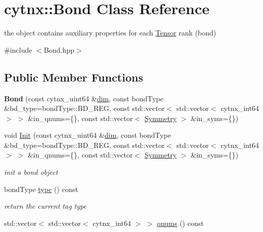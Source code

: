 \hypertarget{classcytnx_1_1Bond}{}\section{cytnx\+:\+:Bond Class Reference}
\label{classcytnx_1_1Bond}


the object contains auxiliary properties for each \hyperlink{classcytnx_1_1Tensor}{Tensor} rank (bond)  




{\ttfamily \#include $<$Bond.\+hpp$>$}

\subsection*{Public Member Functions}
\begin{DoxyCompactItemize}
\item 
\mbox{\label{classcytnx_1_1Bond_a80ee6b9a0dd288e74d885f6f288b5a0c}} 
{\bfseries Bond} (const cytnx\+\_\+uint64 \&\hyperlink{classcytnx_1_1Bond_aa072647e03a4c797479445bd41b9eacf}{dim}, const bond\+Type \&bd\+\_\+type=bond\+Type\+::\+B\+D\+\_\+\+R\+EG, const std\+::vector$<$ std\+::vector$<$ cytnx\+\_\+int64 $>$ $>$ \&in\+\_\+qnums=\{\}, const std\+::vector$<$ \hyperlink{classcytnx_1_1Symmetry}{Symmetry} $>$ \&in\+\_\+syms=\{\})
\item 
void \hyperlink{classcytnx_1_1Bond_a707a803fa98fb6a87b5f3c3b3000509f}{Init} (const cytnx\+\_\+uint64 \&\hyperlink{classcytnx_1_1Bond_aa072647e03a4c797479445bd41b9eacf}{dim}, const bond\+Type \&bd\+\_\+type=bond\+Type\+::\+B\+D\+\_\+\+R\+EG, const std\+::vector$<$ std\+::vector$<$ cytnx\+\_\+int64 $>$ $>$ \&in\+\_\+qnums=\{\}, const std\+::vector$<$ \hyperlink{classcytnx_1_1Symmetry}{Symmetry} $>$ \&in\+\_\+syms=\{\})
\begin{DoxyCompactList}\small\item\em init a bond object \end{DoxyCompactList}\item 
bond\+Type \hyperlink{classcytnx_1_1Bond_a8517743cec9589ed551114ea7e55fbb1}{type} () const
\begin{DoxyCompactList}\small\item\em return the current tag type \end{DoxyCompactList}\item 
std\+::vector$<$ std\+::vector$<$ cytnx\+\_\+int64 $>$ $>$ \hyperlink{classcytnx_1_1Bond_ac33a7bc780a4c7afba2b6d2d571bf23e}{qnums} () const

\end{DoxyCompactItemize}
